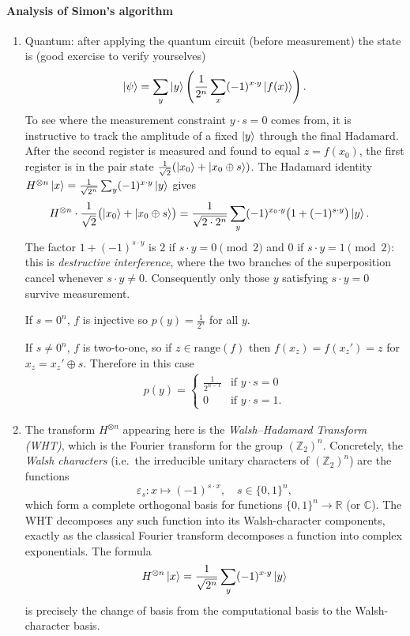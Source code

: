 \paragraph{Analysis of Simon's algorithm}
\begin{enumerate}
    \item Quantum: after applying the quantum circuit (before measurement) the state is (good exercise to verify yourselves)
    \begin{align*}
        \ket{\psi} = \sum_y \ket{y} \left( \frac{1}{2^n} \sum_x (-1)^{x \cdot y} \ket{f(x)} \right).
    \end{align*}
    To see where the measurement constraint $y \cdot s = 0$ comes from, it is instructive to track the amplitude of a fixed $\ket{y}$ through the final Hadamard. After the second register is measured and found to equal $z = f(x_0)$, the first register is in the pair state $\frac{1}{\sqrt{2}}(\ket{x_0}+\ket{x_0 \oplus s})$. The Hadamard identity $H^{\otimes n}\ket{x} = \frac{1}{\sqrt{2^n}}\sum_{y}(-1)^{x \cdot y}\ket{y}$ gives
    \begin{align*}
        H^{\otimes n} \cdot \frac{1}{\sqrt{2}}\bigl(\ket{x_0}+\ket{x_0 \oplus s}\bigr)
        &= \frac{1}{\sqrt{2 \cdot 2^n}} \sum_y (-1)^{x_0 \cdot y}\bigl(1+(-1)^{s \cdot y}\bigr)\ket{y}.
    \end{align*}
    The factor $1+(-1)^{s \cdot y}$ is $2$ if $s \cdot y = 0 \pmod{2}$ and $0$ if $s \cdot y = 1 \pmod{2}$: this is \emph{destructive interference}, where the two branches of the superposition cancel whenever $s \cdot y \neq 0$. Consequently only those $y$ satisfying $s \cdot y = 0$ survive measurement.

    If $s=0^n$, $f$ is injective so $p(y) = \frac{1}{2^n}$ for all $y$.

    If $s \neq 0^n$, $f$ is two-to-one, so if $z \in \text{range}(f)$ then $f(x_z) = f(x_z') = z$ for $x_z = x_z' \oplus s$. Therefore in this case
    \begin{align*}
    p(y)=
    \begin{cases}
        \frac{1}{2^{n-1}} & \text{if } y\cdot s = 0\\
        0 & \text{if } y\cdot s = 1.
    \end{cases}
    \end{align*}

    \item The transform $H^{\otimes n}$ appearing here is the \emph{Walsh--Hadamard Transform (WHT)}, which is the Fourier transform for the group $(\mathbb{Z}_2)^n$. Concretely, the \emph{Walsh characters} (i.e.\ the irreducible unitary characters of $(\mathbb{Z}_2)^n$) are the functions
    \[
        \varepsilon_s : x \mapsto (-1)^{s \cdot x}, \quad s \in \{0,1\}^n,
    \]
    which form a complete orthogonal basis for functions $\{0,1\}^n \to \mathbb{R}$ (or $\mathbb{C}$). The WHT decomposes any such function into its Walsh-character components, exactly as the classical Fourier transform decomposes a function into complex exponentials. The formula
    \[
        H^{\otimes n}\ket{x} = \frac{1}{\sqrt{2^n}}\sum_{y}(-1)^{x \cdot y}\ket{y}
    \]
    is precisely the change of basis from the computational basis to the Walsh-character basis.


\end{enumerate}
